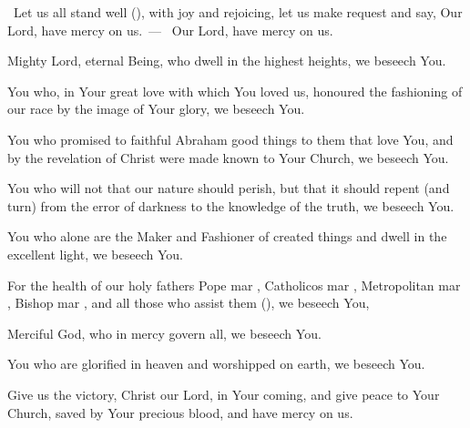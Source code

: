 \documentclass[12pt,twoside,a5paper]{article}
\begin{document}








\dd~Let us all stand well (), with joy and rejoicing, let us make request and say, Our Lord, have mercy on us.~--- \rr~Our Lord, have mercy on us. 

\begin{halfparskip}
   Mighty Lord, eternal Being, who dwell in the highest heights, we beseech You.

  You who, in Your great love with which You loved us, honoured the fashioning of our race by the image of Your glory, we beseech You.

  You who promised to faithful Abraham good things to them that love You, and by the revelation of Christ were made known to Your Church, we beseech You.

  You who will not that our nature should perish, but that it should repent (and turn) from the error of darkness to the knowledge of the truth, we beseech You.

  You who alone are the Maker and Fashioner of created things and dwell in the excellent light, we beseech You.
\end{halfparskip}

\begin{halfparskip}
   For the health of our holy fathers Pope mar \NN, Catholicos mar \NN, Metropolitan mar \NN, Bishop mar \NN, and all those who assist them (), we beseech You,

  Merciful God, who in mercy govern all, we beseech You.

  You who are glorified in heaven and worshipped on earth, we beseech You.

  Give us the victory, Christ our Lord, in Your coming, and give peace to Your Church, saved by Your precious blood, and have mercy on us.
\end{halfparskip}
\end{document}
